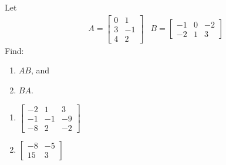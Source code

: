 \begin{Exercise}
Let 
\begin{align*}
& A =
\begin{bmatrix}
0 & 1 \\
3 & -1 \\
4 & 2 
\end{bmatrix}
& B =
\begin{bmatrix}
-1 & 0 & -2 \\
-2 & 1 & 3 
\end{bmatrix}
\end{align*}
Find:
\begin{enumerate}[label=(\alph*)]
\item $AB$, and
\item $BA$.
\end{enumerate}
\end{Exercise}
\begin{Answer}
\begin{enumerate}[label=(\alph*)]
\item $\begin{bmatrix}
-2 & 1 & 3 \\
-1 & -1 & -9 \\
-8 & 2 & -2 
\end{bmatrix}$
\item $\begin{bmatrix}
-8 & -5 \\
15 & 3
\end{bmatrix}$
\end{enumerate}
\end{Answer}

